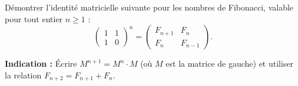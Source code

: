 Démontrer l'identité matricielle suivante pour les nombres de Fibonacci, valable pour tout entier $n \geq 1$ :
\[
\begin{pmatrix} 1 & 1 \\ 1 & 0 \end{pmatrix}^{n}
=
\begin{pmatrix} F_{n+1} & F_n \\ F_n & F_{n-1} \end{pmatrix}.
\]

\textbf{Indication :} Écrire $M^{n+1} = M^n \cdot M$ (où $M$ est la matrice de
gauche) et utiliser la relation $F_{n+2} = F_{n+1} + F_n$.
